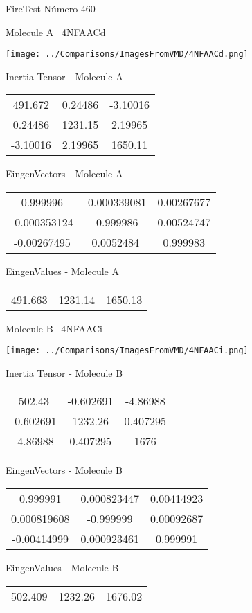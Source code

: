 \vtab[-3cm]
\begin{center}
{\large FireTest \tab Número 460}
\end{center}
\begin{multicols}{2}
\begin{center}

Molecule A \
4NFAACd

\texttt{[image: ../Comparisons/ImagesFromVMD/4NFAACd.png]}

Inertia Tensor - Molecule A \\
\begin{tabular}{|c c c|}
491.672	 & 	0.24486	 & 	-3.10016	 \\
0.24486	 & 	1231.15	 & 	2.19965	 \\
-3.10016	 & 	2.19965	 & 	1650.11
\end{tabular}

\vtab
 EingenVectors - Molecule A     \\
\begin{tabular}{|c c c|}
0.999996	 & 	-0.000339081	 & 	0.00267677	 \\
-0.000353124	 & 	-0.999986	 & 	0.00524747	 \\
-0.00267495	 & 	0.0052484	 & 	0.999983
\end{tabular}

\vtab
 EingenValues - Molecule A     \\
\begin{tabular}{|c c c|}
491.663	 & 	1231.14	 & 	1650.13	 \\
\end{tabular}
\columnbreak

Molecule B \
4NFAACi

\texttt{[image: ../Comparisons/ImagesFromVMD/4NFAACi.png]}

Inertia Tensor - Molecule B \\
\begin{tabular}{|c c c|}
502.43	 & 	-0.602691	 & 	-4.86988	 \\
-0.602691	 & 	1232.26	 & 	0.407295	 \\
-4.86988	 & 	0.407295	 & 	1676
\end{tabular}

\vtab
 EingenVectors - Molecule B     \\
\begin{tabular}{|c c c|}
0.999991	 & 	0.000823447	 & 	0.00414923	 \\
0.000819608	 & 	-0.999999	 & 	0.00092687	 \\
-0.00414999	 & 	0.000923461	 & 	0.999991
\end{tabular}

\vtab
 EingenValues - Molecule B     \\
\begin{tabular}{|c c c|}
502.409	 & 	1232.26	 & 	1676.02	 \\
\end{tabular}

\end{center}
\end{multicols}

